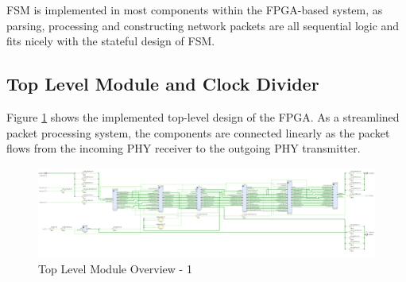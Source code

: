\documentclass[a4paper]{report}
\begin{document}
FSM is implemented in most components within the FPGA-based system, as parsing, processing and constructing network packets are all sequential logic and fits nicely with the stateful design of FSM.

\subsection{Top Level Module and Clock Divider}

Figure \ref{fig:top-level-design} shows the implemented top-level design of the FPGA. As a streamlined packet processing system, the components are connected linearly as the packet flows from the incoming PHY receiver to the outgoing PHY transmitter.

\begin{landscape}
\begin{figure}[h!]
  \centering
  \includegraphics*[viewport={0 0 950 600}, height=\textwidth, width=2\textheight, keepaspectratio]{imgs/top-level-module.png}
  \caption{Top Level Module Overview - 1}
  \label{fig:top-level-design}
\end{figure}
\begin{figure}[h!]
  \ContinuedFloat
  \centering

\end{figure}
\end{landscape}
\end{document}
